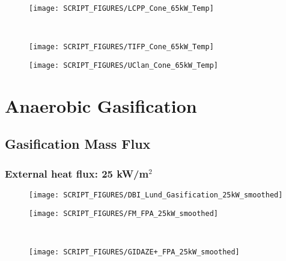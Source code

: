 \begin{minipage}{0.35\textwidth}
\begin{figure}[H]
{\texttt{[image: SCRIPT\_FIGURES/LCPP\_Cone\_65kW\_Temp]}}\\
\end{figure}
\end{minipage}\\
\begin{minipage}{0.5\textwidth}
\begin{figure}[H]
{\texttt{[image: SCRIPT\_FIGURES/TIFP\_Cone\_65kW\_Temp]}}\\
\end{figure}
\end{minipage}
\begin{minipage}{0.35\textwidth}
\begin{figure}[H]
{\texttt{[image: SCRIPT\_FIGURES/UClan\_Cone\_65kW\_Temp]}}\\
\end{figure}
\end{minipage}
\vfill

\section{Anaerobic Gasification}
\subsection{Gasification Mass Flux}
\label{Gas_Mass}
\subsubsection{External heat flux: 25 kW/m$^2$}
\begin{minipage}{0.5\textwidth}
\begin{figure}[H]
{\texttt{[image: SCRIPT\_FIGURES/DBI\_Lund\_Gasification\_25kW\_smoothed]}}\\
\end{figure}
\end{minipage}
\begin{minipage}{0.35\textwidth}
\begin{figure}[H]
{\texttt{[image: SCRIPT\_FIGURES/FM\_FPA\_25kW\_smoothed]}}\\
\end{figure}
\end{minipage}\\
\begin{minipage}{0.5\textwidth}
\begin{figure}[H]
{\texttt{[image: SCRIPT\_FIGURES/GIDAZE+\_FPA\_25kW\_smoothed]}}\\
\end{figure}
\end{minipage}
\vfill

